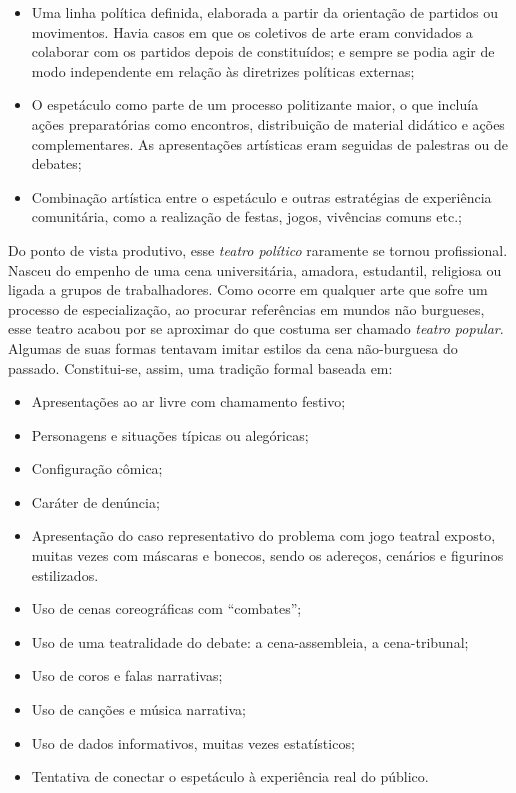 \begin{itemize}
\item
  Uma linha política definida, elaborada a partir da orientação de
  partidos ou movimentos. Havia casos em que os coletivos de arte eram
  convidados a colaborar com os partidos depois de constituídos; e
  sempre se podia agir de modo independente em relação às diretrizes
  políticas externas;
\item
  O espetáculo como parte de um processo politizante maior, o que
  incluía ações preparatórias como encontros, distribuição de material
  didático e ações complementares. As apresentações artísticas eram
  seguidas de palestras ou de debates;
\item
  Combinação artística entre o espetáculo e outras estratégias de
  experiência comunitária, como a realização de festas, jogos, vivências
  comuns etc.;
\end{itemize}

Do ponto de vista produtivo, esse \textit{teatro político} raramente se
tornou profissional. Nasceu do empenho de uma cena universitária,
amadora, estudantil, religiosa ou ligada a grupos de trabalhadores. Como
ocorre em qualquer arte que sofre um processo de especialização, ao
procurar referências em mundos não burgueses, esse teatro acabou por se
aproximar do que costuma ser chamado \textit{teatro popular}. Algumas de
suas formas tentavam imitar estilos da cena não-burguesa do passado.
Constitui-se, assim, uma tradição formal baseada em:

\begin{itemize}
\item
  Apresentações ao ar livre com chamamento festivo;
\item
  Personagens e situações típicas ou alegóricas;
\item
  Configuração cômica;
\item
  Caráter de denúncia;
\item
  Apresentação do caso representativo do problema com jogo teatral
  exposto, muitas vezes com máscaras e bonecos, sendo os adereços,
  cenários e figurinos estilizados.
\item
  Uso de cenas coreográficas com “combates”;
\item
  Uso de uma teatralidade do debate: a cena-assembleia, a cena-tribunal;
\item
  Uso de coros e falas narrativas;
\item
  Uso de canções e música narrativa;
\item
  Uso de dados informativos, muitas vezes estatísticos;
\item
  Tentativa de conectar o espetáculo à experiência real do público.
\end{itemize}


